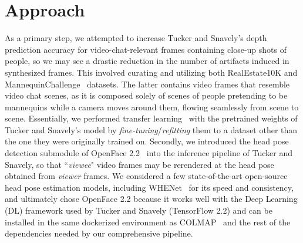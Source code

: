 \section{Approach}\label{sec:approach} 

As a primary step, we attempted to increase Tucker and Snavely's depth prediction accuracy for video-chat-relevant frames containing close-up shots of people, so we may see a drastic reduction in the number of artifacts induced in synthesized frames. This involved curating and utilizing both RealEstate10K and MannequinChallenge~\cite{li2019learning} datasets. The latter contains video frames that resemble video chat scenes, as it is composed solely of scenes of people pretending to be mannequins while a camera moves around them, flowing seamlessly from scene to scene. Essentially, we performed transfer learning~\cite{radhakrishnan_what_2019} with the pretrained weights of Tucker and Snavely's model by \textit{fine-tuning}/\textit{refitting} them to a dataset other than the one they were originally trained on. Secondly, we introduced the head pose detection submodule of OpenFace 2.2~\cite{baltrusaitis_openface_2018} into the inference pipeline of Tucker and Snavely, so that ``\textit{viewee}" video frames may be rerendered at the head pose obtained from \textit{viewer} frames. We considered a few state-of-the-art open-source head pose estimation models, including WHENet~\cite{zhou_whenet_2020} for its speed and consistency, and ultimately chose OpenFace 2.2 because it works well with the Deep Learning (DL) framework used by Tucker and Snavely (TensorFlow 2.2) and can be installed in the same dockerized environment as COLMAP~\cite{schoenberger2016sfm,schoenberger2016mvs} and the rest of the dependencies needed by our comprehensive pipeline. 


